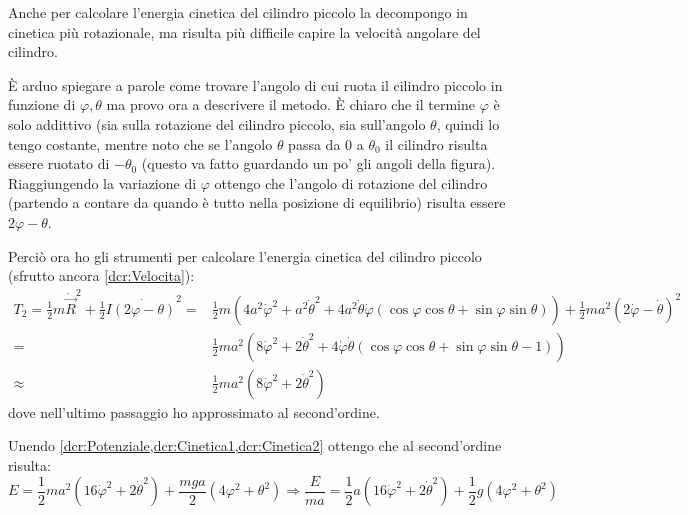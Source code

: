 \documentclass[../main.tex]{subfiles}
\begin{document}
Anche per calcolare l'energia cinetica del cilindro piccolo la decompongo in cinetica più rotazionale, ma risulta più difficile capire la velocità angolare del cilindro.

È arduo spiegare a parole come trovare l'angolo di cui ruota il cilindro piccolo in funzione di $\varphi,\theta$ ma provo ora a descrivere il metodo.
È chiaro che il termine $\varphi$ è solo addittivo (sia sulla rotazione del cilindro piccolo, sia sull'angolo $\theta$, quindi lo tengo costante, mentre noto che se l'angolo $\theta$ passa da $0$ a $\theta_0$ il cilindro risulta essere ruotato di $-\theta_0$ (questo va fatto guardando un po' gli angoli della figura).
Riaggiungendo la variazione di $\varphi$ ottengo che l'angolo di rotazione del cilindro (partendo a contare da quando è tutto nella posizione di equilibrio) risulta essere $2\varphi-\theta$.

Perciò ora ho gli strumenti per calcolare l'energia cinetica del cilindro piccolo (sfrutto ancora \cref{dcr:Velocita}):
\begin{equation}\begin{split}\label{dcr:Cinetica2}
	T_2=\frac 12 m {\dot{\vec R}}^2+\frac 12 I \dot{(2\varphi-\theta)}^2=&
	\frac12m\left(4a^2{\dot\varphi}^2+a^2{\dot\theta}^2+4a^2\dot\theta\dot\varphi(\cos\varphi\cos\theta+\sin\varphi\sin\theta)\right)
	+\frac12ma^2\left(2\dot\varphi-\dot\theta\right)^2 \\
	=& \frac 12ma^2\left(8{\dot\varphi}^2+2{\dot\theta}^2
	+4\dot\varphi\dot\theta(\cos\varphi\cos\theta+\sin\varphi\sin\theta-1)\right) \\
	\approx & \frac12ma^2\left(8{\dot\varphi}^2+2{\dot\theta}^2\right)
\end{split}\end{equation}
dove nell'ultimo passaggio ho approssimato al second'ordine.

Unendo \cref{dcr:Potenziale,dcr:Cinetica1,dcr:Cinetica2} ottengo che al second'ordine risulta:
\begin{equation}\label{dcr:Energia}
	E=\frac12ma^2\left(16{\dot\varphi}^2+2{\dot\theta}^2\right)+\frac{mga}2\left(4\varphi^2+\theta^2\right)
	\Rightarrow \frac{E}{ma}=
	\frac12a\left(16{\dot\varphi}^2+2{\dot\theta}^2\right)
	+\frac12g\left(4\varphi^2+\theta^2\right)
\end{equation}
\end{document}
